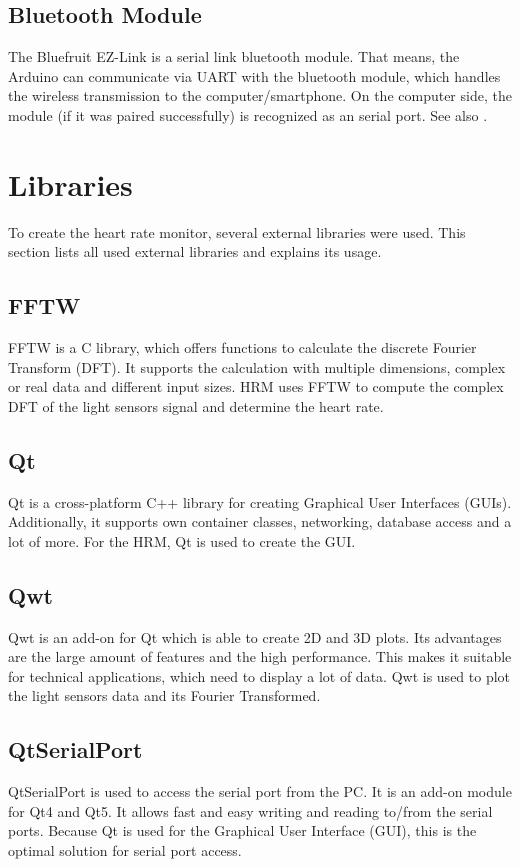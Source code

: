 \documentclass[notitlepage]{scrreprt}
\begin{document}
\subsection{Bluetooth Module}
The Bluefruit EZ-Link is a serial link bluetooth module. That means, the Arduino can communicate via UART with the bluetooth module, which handles the wireless transmission to the computer/smartphone. On the computer side, the module (if it was paired successfully) is recognized as an serial port. See also \cite{bib:bluetooth-adapter}.

\newpage

\section{Libraries}
To create the heart rate monitor, several external libraries were used. This section lists all used external libraries and explains its usage.

\subsection{FFTW}
FFTW is a C library, which offers functions to calculate the discrete Fourier Transform (DFT). It supports the calculation with multiple dimensions, complex or real data and different input sizes. HRM uses FFTW to compute the complex DFT of the light sensors signal and determine the heart rate.

\subsection{Qt}
Qt is a cross-platform C++ library for creating Graphical User Interfaces (GUIs). Additionally, it supports own container classes, networking, database access and a lot of more. For the HRM, Qt is used to create the GUI.

\subsection{Qwt}
Qwt is an add-on for Qt which is able to create 2D and 3D plots. Its advantages are the large amount of features and the high performance. This makes it suitable for technical applications, which need to display a lot of data. Qwt is used to plot the light sensors data and its Fourier Transformed.

\subsection{QtSerialPort}
QtSerialPort is used to access the serial port from the PC. It is an add-on module for Qt4 and Qt5. It allows fast and easy writing and reading to/from the serial ports. Because Qt is used for the Graphical User Interface (GUI), this is the optimal solution for serial port access.
\end{document}
